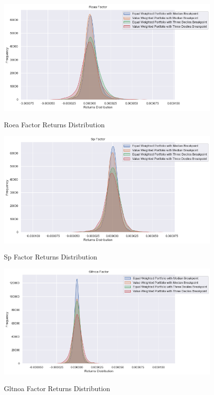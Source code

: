 \begin{figure}[H]
	\caption{Roea Factor Returns Distribution}
	\centering
	\includegraphics[scale=.63]{../../output/figures/roea.png}
	\label{fig:roea}
\end{figure}

\begin{figure}[H]
	\caption{Sp Factor Returns Distribution}
	\centering
	\includegraphics[scale=.63]{../../output/figures/sp.png}
	\label{fig:sp}
\end{figure}

\begin{figure}[H]
	\caption{Gltnoa Factor Returns Distribution}
	\centering
	\includegraphics[scale=.63]{../../output/figures/gltnoa.png}
	\label{fig:gltnoa}
\end{figure}

